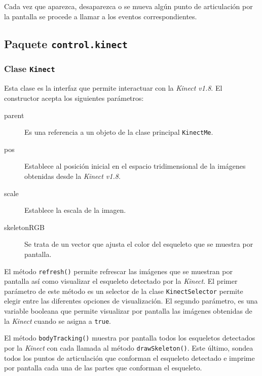 \documentclass[10pt,a4paper]{report}
\begin{document}
	 Cada vez que aparezca, desaparezca o se mueva algún punto de articulación por la pantalla se procede a llamar a los eventos correspondientes.
	 
	 
	
	
	\subsection{Paquete \texttt{control.kinect}}
	\subsubsection{Clase \texttt{Kinect}}\label{class:control.kinect}
	Esta clase es la interfaz que permite interactuar con la \textit{Kinect v1.8}. El constructor acepta los siguientes parámetros:
	\begin{description}
	\item[parent] Es una referencia a un objeto de la clase principal \texttt{KinectMe}.
	\item[pos] Establece al posición inicial en el espacio tridimensional de la imágenes obtenidas desde la \textit{Kinect v1.8}.
	\item[scale] Establece la escala de la imagen.
	\item[skeletonRGB] Se trata de un vector que ajusta el color del esqueleto que se muestra por pantalla.
	\end{description}
	
	
	
	El método \texttt{refresh()} permite refrescar las imágenes que se muestran por pantalla así como visualizar el esqueleto detectado por la \textit{Kinect}. El primer parámetro de este método es un selector de la clase \texttt{KinectSelector} permite elegir entre las diferentes opciones de visualización. El segundo parámetro, es una variable booleana que permite visualizar por pantalla las imágenes obtenidas de la \textit{Kinect} cuando se asigna a \texttt{true}.
	
	
	
	El método \texttt{bodyTracking()} muestra por pantalla todos los esqueletos detectados por la \textit{Kinect} con cada llamada al método \texttt{drawSkeleton()}. Este último, sondea todos los puntos de articulación que conforman el esqueleto detectado e imprime por pantalla cada una de las partes que conforman el esqueleto.
	
\end{document}
